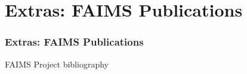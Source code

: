 \documentclass[
	aspectratio=169, %
	12pt, %
	t, %
]{beamer}
\begin{document}
\section{Extras: FAIMS Publications}

\begin{sectionframe} %
	\frametitle{Extras: FAIMS Publications}


\end{sectionframe}
\begin{frame}[allowframebreaks]{FAIMS Project bibliography}
\begin{refsegment}


\nocite{ballsun-stantonFAIMSMobileFlexible2018,rossBuildingBazaarEnhancing2015,rossCreatingEresearchTools2013a,rossIntroducingPreregistrationResearch2020,sobotkovaArbitraryOfflineData2015a,sobotkovaDeployingOfflineMultiuser2021,sobotkovaMeasureTwiceCut2016,sobotkovaSociotechnicalObstaclesArchaeological2018,thorneM436DistalFootprints2018,vanvalkenburghMobilizationMediationImplementing2018}

\printbibliography[heading=none, segment=2]

\end{refsegment}
\end{frame}
    



	
	
\end{document}
